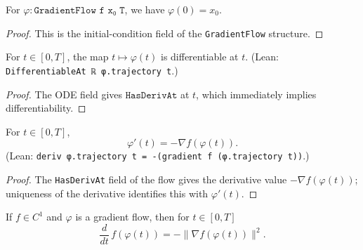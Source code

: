 \begin{lemma}\label{lem:GradientFlow.trajectory_zero}
  \leanok{}
  For $\varphi : \texttt{GradientFlow f x₀ T}$, we have $\varphi(0)=x_0$.
\end{lemma}
\begin{proof}
  \leanok{}
  This is the initial-condition field of the \texttt{GradientFlow} structure.
\end{proof}

\begin{lemma}\label{lem:GradientFlow.differentiableAt}
  \leanok{}
  For $t\in[0,T]$, the map $t\mapsto \varphi(t)$ is differentiable at $t$.
  (Lean: \texttt{DifferentiableAt ℝ φ.trajectory t}.)
\end{lemma}
\begin{proof}
  \leanok{}
  The ODE field gives $\texttt{HasDerivAt}$ at $t$, which immediately implies differentiability.
\end{proof}

\begin{lemma}\label{lem:GradientFlow.deriv_eq}
  \leanok{}
  For $t\in[0,T]$,
  \[
    \varphi'(t) = -\nabla f(\varphi(t)).
  \]
  (Lean: \texttt{deriv φ.trajectory t = -(gradient f (φ.trajectory t))}.)
\end{lemma}
\begin{proof}
  \leanok{}
  The \texttt{HasDerivAt} field of the flow gives the derivative value $-\nabla f(\varphi(t))$;
  uniqueness of the derivative identifies this with $\varphi'(t)$.
\end{proof}


\begin{lemma}\label{lem:GradientFlow.hasDerivAt_energy}
  \leanok{}
  If $f\in C^1$ and $\varphi$ is a gradient flow, then for $t\in[0,T]$
  \[
    \frac{d}{dt}\, f(\varphi(t)) = -\|\nabla f(\varphi(t))\|^2.
  \]
\end{lemma}

